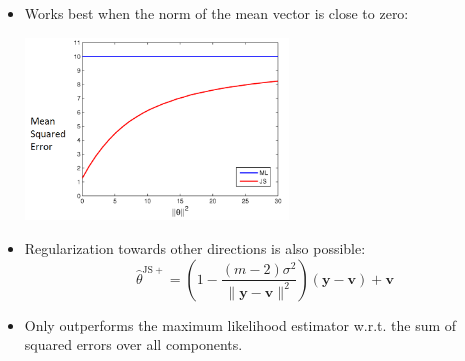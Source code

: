 \documentclass[]{beamer}
\renewcommand{\vec}[1]{\boldsymbol{#1}}
\newcommand{\by}{\boldsymbol{y}}
\begin{document}
\begin{frame}


\begin{itemize}

\item Works best when the norm of the mean vector is close to zero:\\
\begin{center}
\includegraphics[width=7cm]{Figures/JS}
\end{center} \pause 
\item Regularization towards other directions is also possible:
$$
\hat{\theta}^{\mathrm{JS+}} = \left (1 - \frac{(m-2)\sigma^2}{\|\by - \vec{v}\|^2} \right )(\by - \vec{v}) + \vec{v}
$$
\item Only outperforms the maximum likelihood estimator w.r.t. the sum of squared errors over all components.

\end{itemize}
\end{frame}
\end{document}
